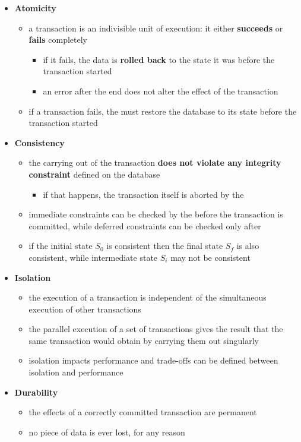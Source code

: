 \documentclass[english]{article}
\begin{document}
\begin{itemize}
  \item \textbf{Atomicity}
        \begin{itemize}
          \item a transaction is an indivisible unit of execution: it either \textbf{succeeds} or \textbf{fails} completely
                \begin{itemize}
                  \item if it fails, the data is \textbf{rolled back} to the state it was before the transaction started
                  \item an error after the end does not alter the effect of the transaction
                \end{itemize}
          \item if a transaction fails, the \dbms must restore the database to its state before the transaction started
        \end{itemize}
  \item \textbf{Consistency}
        \begin{itemize}
          \item the carrying out of the transaction \textbf{does not violate any integrity constraint} defined on the database
                \begin{itemize}
                  \item if that happens, the transaction itself is aborted by the \dbms
                \end{itemize}
          \item immediate constraints can be checked by the \dbms before the transaction is committed, while deferred constraints can be checked only after
          \item if the initial state \(S_0\) is consistent then the final state \(S_f\) is also consistent, while intermediate state \(S_i\) may not be consistent
        \end{itemize}
  \item \textbf{Isolation}
        \begin{itemize}
          \item the execution of a transaction is independent of the simultaneous execution of other transactions
          \item the parallel execution of a set of transactions gives the result that the same transaction would obtain by carrying them out singularly
          \item isolation impacts performance and trade-offs can be defined between isolation and performance
        \end{itemize}
  \item \textbf{Durability}
        \begin{itemize}
          \item the effects of a correctly committed transaction are permanent
          \item no piece of data is ever lost, for any reason
        \end{itemize}
\end{itemize}
\end{document}
